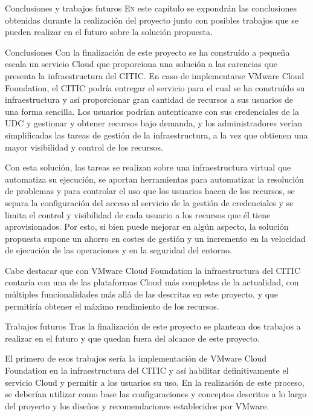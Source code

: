 \begin{chapter}{Conclusiones y trabajos futuros}
    \lettrine{E}{n} este capítulo se expondrán las conclusiones obtenidas durante la realización del proyecto junto con posibles trabajos que se pueden realizar en el futuro sobre la solución propuesta.
    
    \begin{section}{Conclusiones}
        Con la finalización de este proyecto se ha construído a pequeña escala un servicio Cloud que proporciona una solución a las carencias que presenta la infraestructura del CITIC. En caso de implementarse VMware Cloud Foundation, el CITIC podría entregar el servicio para el cual se ha construído su infraestructura y así proporcionar gran cantidad de recursos a sus usuarios de una forma sencilla. Los usuarios podrían autenticarse con sus credenciales de la UDC y gestionar y obtener recursos bajo demanda, y los administradores verían simplificadas las tareas de gestión de la infraestructura, a la vez que obtienen una mayor visibilidad y control de los recursos.

        Con esta solución, las tareas se realizan sobre una infraestructura virtual que automatiza su ejecución, se aportan herramientas para automatizar la resolución de problemas y para controlar el uso que los usuarios hacen de los recursos, se separa la configuración del acceso al servicio de la gestión de credenciales y se limita el control y visibilidad de cada usuario a los recursos que él tiene aprovisionados. Por esto, si bien puede mejorar en algún aspecto, la solución propuesta supone un ahorro en costes de gestión y un incremento en la velocidad de ejecución de las operaciones y en la seguridad del entorno.

        Cabe destacar que con VMware Cloud Foundation la infraestructura del CITIC contaría con una de las plataformas Cloud más completas de la actualidad, con múltiples funcionalidades más allá de las descritas en este proyecto, y que permitiría obtener el máximo rendimiento de los recursos.
    \end{section}
    \begin{section}{Trabajos futuros}
        Tras la finalización de este proyecto se plantean dos trabajos a realizar en el futuro y que quedan fuera del alcance de este proyecto.

        El primero de esos trabajos sería la implementación de VMware Cloud Foundation en la infraestructura del CITIC y así habilitar definitivamente el servicio Cloud y permitir a los usuarios su uso. En la realización de este proceso, se deberían utilizar como base las configuraciones y conceptos descritos a lo largo del proyecto y los diseños y recomendaciones establecidos por VMware.
        

\end{section}
\end{chapter}
